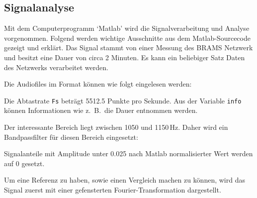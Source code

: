 \begin{refsection}
\subsection{Signalanalyse}
Mit dem Computerprogramm `Matlab' wird die Signalverarbeitung und Analyse vorgenommen.
Folgend werden wichtige Ausschnitte aus dem Matlab-Sourcecode gezeigt und erklärt.
Das Signal stammt von einer Messung des BRAMS Netzwerk und besitzt eine Dauer von circa 2 Minuten.
Es kann ein beliebiger Satz Daten des Netzwerks verarbeitet werden.

Die Audiofiles im  Format können wie folgt eingelesen werden:

Die Abtastrate \texttt{Fs} beträgt 5512.5 Punkte pro Sekunde.
Aus der Variable \texttt{info} können Informationen wie z.~B.~die Dauer entnommen werden. 

Der interessante Bereich liegt zwischen 1050 und 1150\,Hz.
Daher wird ein Bandpassfilter für diesen Bereich eingesetzt:


Signalanteile mit Amplitude unter 0.025 nach Matlab normalisierter Wert werden auf 0 gesetzt.


Um eine Referenz zu haben, sowie einen Vergleich machen zu können, wird das Signal zuerst mit einer gefensterten Fourier-Transformation dargestellt. 



\end{refsection}
